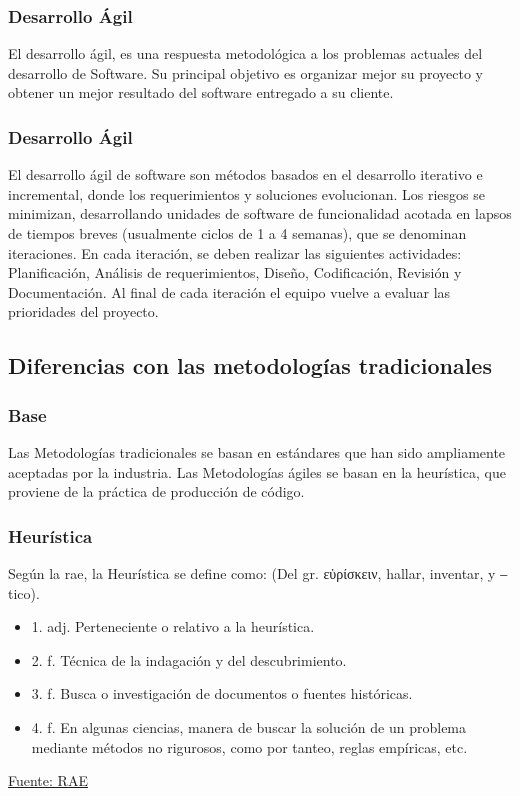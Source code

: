 \documentclass[12pt]{beamer}
\begin{document}
\begin{frame}
 \frametitle{Desarrollo Ágil}
 El desarrollo ágil, es una respuesta \alert{metodológica} a los problemas actuales del desarrollo de Software. Su principal objetivo es organizar mejor su proyecto y obtener un mejor resultado del software entregado a su cliente.
\end{frame}


\begin{frame}
 \frametitle{Desarrollo Ágil}
 El desarrollo ágil de software son métodos basados en el desarrollo iterativo e incremental, donde los requerimientos y soluciones \alert{evolucionan}.
 \newline
 Los riesgos se minimizan, desarrollando unidades de software de funcionalidad acotada en lapsos de tiempos breves (usualmente ciclos de 1 a 4 semanas), que se denominan \alert{iteraciones}.
 \newline
 En cada iteración, se deben realizar las siguientes actividades: Planificación, Análisis de requerimientos, Diseño, Codificación, Revisión y Documentación. Al final de cada iteración el equipo vuelve a evaluar las prioridades del proyecto.
\end{frame}

\subsection{Diferencias con las metodologías tradicionales}
\begin{frame}
 \frametitle{Base}
 Las Metodologías tradicionales se basan en \alert{estándares} que han sido ampliamente aceptadas por la industria. 
 \pause
 Las Metodologías ágiles se basan en la heurística, que proviene de la práctica de producción de código.
\end{frame}


\begin{frame}
 \frametitle{Heurística}
 Según la rae, la Heurística se define como:
 \newline
  (Del gr. εὑρίσκειν, hallar, inventar, y ‒tico).
  \begin{itemize}
   \item 1. adj. Perteneciente o relativo a la heurística.
   \item 2. f. Técnica de la indagación y del descubrimiento.
   \item 3. f. Busca o investigación de documentos o fuentes históricas.
   \item 4. f. En algunas ciencias, manera de buscar la solución de un problema mediante métodos no rigurosos, como por tanteo, reglas empíricas, etc.
  \end{itemize}

  \href{http://lema.rae.es/drae/?val=heurística}{Fuente: RAE}
\end{frame}
\end{document}
